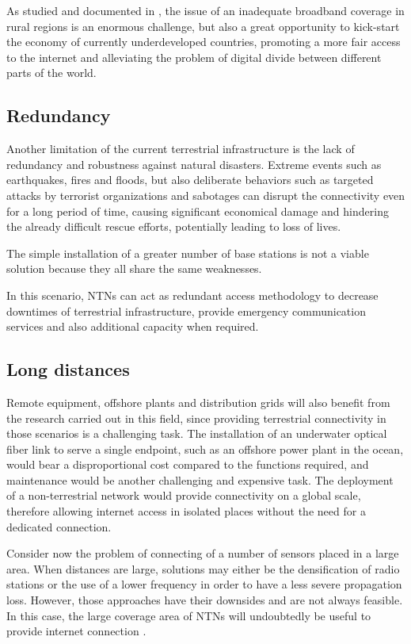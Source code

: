 As studied and documented in \cite{6g-challenge-opportunity-base-pyramid}, the issue of an inadequate broadband coverage in rural regions is an enormous challenge, but also a great opportunity to kick-start the economy of currently underdeveloped countries, promoting a more fair access to the internet and alleviating the problem of digital divide between different parts of the world.

\subsection{Redundancy}
Another limitation of the current terrestrial infrastructure is the lack of redundancy and robustness against natural disasters. Extreme events such as earthquakes, fires and floods, but also deliberate behaviors such as targeted attacks by terrorist organizations and sabotages can disrupt the connectivity even for a long period of time, causing significant economical damage and hindering the already difficult rescue efforts, potentially leading to loss of lives.

The simple installation of a greater number of base stations is not a viable solution because they all share the same weaknesses.

In this scenario, \ac{NTNs} can act as redundant access methodology to decrease downtimes of terrestrial infrastructure, provide emergency communication services and also additional capacity when required. 

\subsection{Long distances}
Remote equipment, offshore plants and distribution grids will also benefit from the research carried out in this field, since providing terrestrial connectivity in those scenarios is a challenging task. The installation of an underwater optical fiber link to serve a single endpoint, such as an offshore power plant in the ocean, would bear a disproportional cost compared to the functions required, and maintenance would be another challenging and expensive task. 
The deployment of a non-terrestrial network would provide connectivity on a global scale, therefore allowing internet access in isolated places without the need for a dedicated connection.

Consider now the problem of connecting of a number of sensors placed in a large area. When distances are large, solutions may either be the densification of radio stations or the use of a lower frequency in order to have a less severe propagation loss. However, those approaches have their downsides and are not always feasible. In this case, the large coverage area of \ac{NTNs} will undoubtedly be useful to provide internet connection \cite{performance-ntn-support-iot-wang}.

